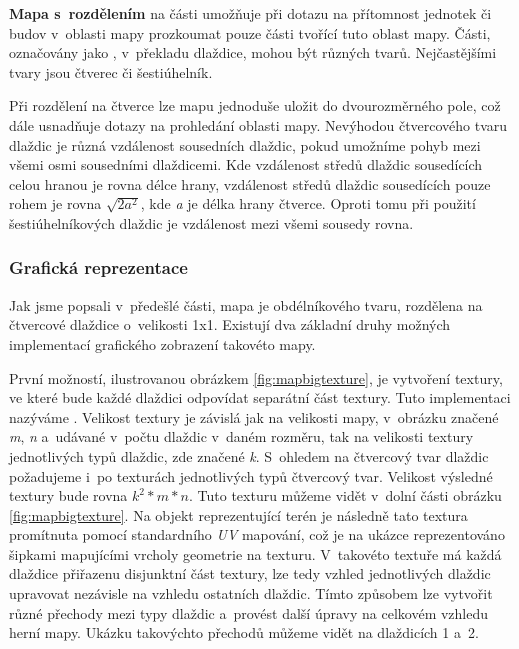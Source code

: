 \textbf{Mapa s~rozdělením} na části umožňuje při dotazu na přítomnost jednotek či budov v~oblasti mapy prozkoumat pouze části tvořící tuto oblast mapy. Části, označovány jako \textit{ }, v~překladu dlaždice, mohou být různých tvarů. Nejčastějšími tvary jsou čtverec či šestiúhelník. 

Při rozdělení na čtverce lze mapu jednoduše uložit do dvourozměrného pole, což dále usnadňuje dotazy na prohledání oblasti mapy. Nevýhodou čtvercového tvaru dlaždic je různá vzdálenost sousedních dlaždic, pokud umožníme pohyb mezi všemi osmi sousedními dlaždicemi. Kde vzdálenost středů dlaždic sousedících celou hranou je rovna délce hrany, vzdálenost středů dlaždic sousedících pouze rohem je rovna \(\sqrt{2a^2}\), kde \textit{a} je délka hrany čtverce. Oproti tomu při použití šestiúhelníkových dlaždic je vzdálenost mezi všemi sousedy rovna. 

\subsubsection{Grafická reprezentace} 
\label{sec:mapgraphicsanalaysis}
Jak jsme popsali v~předešlé části, mapa je obdélníkového tvaru, rozdělena na čtvercové dlaždice o~velikosti 1x1. Existují dva základní druhy možných implementací grafického zobrazení takovéto mapy.

První možností, ilustrovanou obrázkem \ref{fig:mapbigtexture}, je vytvoření textury, ve které bude každé dlaždici odpovídat separátní část textury. Tuto implementaci nazýváme . Velikost textury je závislá jak na velikosti mapy, v~obrázku značené \textit{m}, \textit{n} a~udávané v~počtu dlaždic v~daném rozměru, tak na velikosti textury jednotlivých typů dlaždic, zde značené \textit{k}. S~ohledem na čtvercový tvar dlaždic požadujeme i~po texturách jednotlivých typů čtvercový tvar. Velikost výsledné textury bude rovna \(k^2 * m * n\). Tuto texturu můžeme vidět v~dolní části obrázku \ref{fig:mapbigtexture}. Na objekt reprezentující terén je následně tato textura promítnuta pomocí standardního \textit{UV} mapování, což je na ukázce reprezentováno šipkami mapujícími vrcholy geometrie na texturu. V~takovéto textuře má každá dlaždice přiřazenu disjunktní část textury, lze tedy vzhled jednotlivých dlaždic upravovat nezávisle na vzhledu ostatních dlaždic. Tímto způsobem lze vytvořit různé přechody mezi typy dlaždic a~provést další úpravy na celkovém vzhledu herní mapy. Ukázku takovýchto přechodů můžeme vidět na dlaždicích 1 a~2.
 
